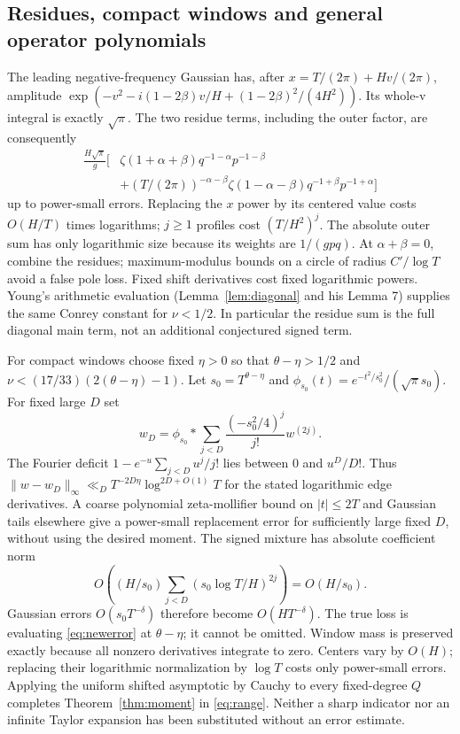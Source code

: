 \documentclass[11pt]{article}
\theoremstyle{remark}
\begin{document}
\subsection{Residues, compact windows and general operator polynomials}
The leading negative-frequency Gaussian has, after
$x=T/(2\pi)+Hv/(2\pi)$, amplitude
$\exp(-v^2-i(1-2\beta)v/H+(1-2\beta)^2/(4H^2))$.
Its whole-v integral is exactly $\sqrt\pi$.
The two residue terms, including the outer factor, are consequently
\[
 \begin{aligned}
 \frac{H\sqrt\pi}g\big[&
 \zeta(1+\alpha+\beta)q^{-1-\alpha}p^{-1-\beta}\\
 &+(T/(2\pi))^{-\alpha-\beta}\zeta(1-\alpha-\beta)
                       q^{-1+\beta}p^{-1+\alpha}\big]
 \end{aligned}
\]
up to power-small errors. Replacing the $x$ power by its centered value
costs $O(H/T)$ times logarithms; $j\ge1$ profiles cost $(T/H^2)^j$.
The absolute outer sum has only logarithmic size because its weights
are $1/(gpq)$. At $\alpha+\beta=0$, combine the residues; maximum-modulus
bounds on a circle of radius $C'/\log T$ avoid a false pole loss.
Fixed shift derivatives cost fixed logarithmic powers. Young's arithmetic
evaluation (Lemma~\ref{lem:diagonal} and his Lemma 7) supplies the same
Conrey constant for $\nu<1/2$. In particular the residue sum is the full
diagonal main term, not an additional conjectured signed term.

For compact windows choose fixed $\eta>0$ so that
$\theta-\eta>1/2$ and $\nu<(17/33)(2(\theta-\eta)-1)$.
Let $s_0=T^{\theta-\eta}$ and
$\phi_{s_0}(t)=e^{-t^2/s_0^2}/(\sqrt\pi s_0)$. For fixed large $D$ set
\[
 w_D=\phi_{s_0}*\sum_{j<D}\frac{(-s_0^2/4)^j}{j!}w^{(2j)}.
\]
The Fourier deficit $1-e^{-u}\sum_{j<D}u^j/j!$ lies between $0$ and
$u^D/D!$. Thus $\|w-w_D\|_\infty\ll_D
T^{-2D\eta}\log^{2D+O(1)}T$ for the stated logarithmic edge derivatives.
A coarse polynomial zeta-mollifier bound on $|t|\le2T$ and Gaussian
tails elsewhere give a power-small replacement error for sufficiently
large fixed $D$, without using the desired moment. The signed mixture
has absolute coefficient norm
\[
 O\left((H/s_0)\sum_{j<D}(s_0\log T/H)^{2j}\right)=O(H/s_0).
\]
Gaussian errors $O(s_0T^{-\delta})$ therefore become $O(HT^{-\delta})$.
The true loss is evaluating \eqref{eq:newerror} at $\theta-\eta$;
it cannot be omitted. Window mass is preserved exactly because all
nonzero derivatives integrate to zero. Centers vary by $O(H)$;
replacing their logarithmic normalization by $\log T$ costs only
power-small errors. Applying the uniform shifted asymptotic by Cauchy
to every fixed-degree $Q$ completes Theorem~\ref{thm:moment} in
\eqref{eq:range}. Neither a sharp indicator nor an infinite Taylor
expansion has been substituted without an error estimate.
\end{document}
